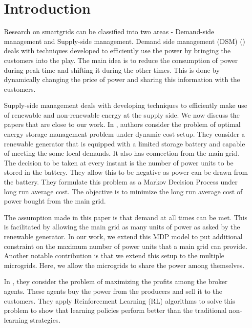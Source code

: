 \section{Introduction}


Research on smartgrids can be classified into two areas -  Demand-side management and Supply-side management. Demand side management (DSM) (\cite{logenthiran2011multi, wang2010demand,dsm1,dsm2,dsm3,dsm4}) deals with techniques developed to efficiently use the power by bringing the customers into the play. The main idea is to reduce the consumption of power during peak time and shifting it during the other times. This is done by dynamically changing the price of power and sharing this information with the customers. 

Supply-side management deals with developing techniques to efficiently make use of renewable and non-renewable energy at the supply side. We now discuss the papers that are close to our work. In \cite{PHarsha}, authors consider the problem of optimal energy storage management problem under dynamic cost setup. They consider a renewable generator that is equipped with a limited storage battery and capable of meeting the some local demands. It also has connection from the main grid. The decision to be taken at every instant is the number of power units to be stored in the battery. They allow this to be negative as power can be drawn from the battery. They formulate this problem as a Markov Decision Process under long run average cost. The objective is to minimize the long run average cost of power bought from the main grid.

The assumption made in this paper is that demand at all times can be met. This is facilitated by allowing the main grid as many units of power as asked by the renewable generator. In our work, we extend this MDP model to put additional constraint on the maximum number of power units that a main grid can provide. Another notable contribution is that we extend this setup to the multiple microgrids. Here, we allow the microgrids to share the power among themselves.  

In \cite{reddy2011learned}, they consider the problem of maximizing the profits among the broker agents. These agents buy the power from the producers and sell it to the customers. They apply Reinforcement Learning (RL) algorithms to solve this problem to show that learning policies perform better than the traditional non-learning strategies.

